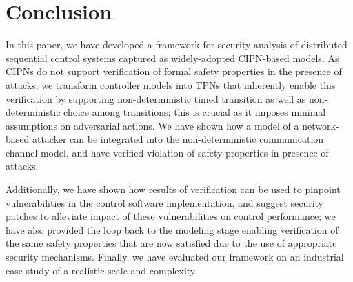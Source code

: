 


\section{Conclusion}
\label{sec:conclusion}
In this paper, we have developed a framework for security analysis of distributed sequential control systems captured as widely-adopted CIPN-based models. As CIPNs do not support verification of formal safety properties in the presence of attacks, we transform controller models into TPNs that inherently enable this verification by supporting non-deterministic timed transition as well as non-deterministic choice among transitions; this is crucial as it imposes minimal assumptions on adversarial actions. We have shown how a model of a network-based attacker can be integrated into the non-deterministic communication channel model, and have verified violation of safety properties in presence of attacks. 

Additionally, we have shown how results of verification can be used to pinpoint vulnerabilities in the control software implementation, and suggest security patches to alleviate impact of these vulnerabilities on control performance; we have also provided the loop back to the modeling stage enabling verification of the same safety properties that are now satisfied due to the use of appropriate security mechanisms. Finally, we have evaluated our framework on an industrial case study of a realistic scale and complexity. 